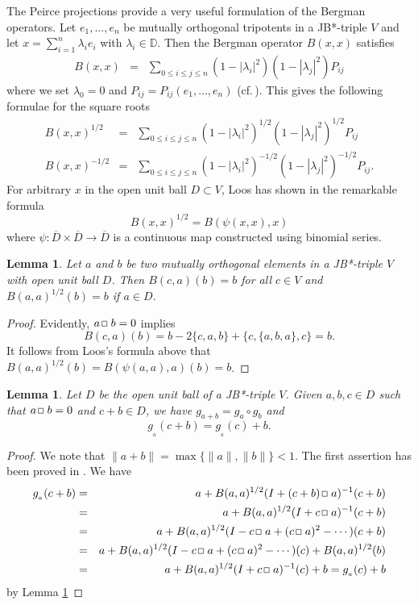 \documentclass[12pt, twoside]{article}
\def\sqr#1#2{{\,\vcenter{\vbox{\hrule height.#2pt\hbox{\vrule width.#2pt
height#1pt \kern#1pt\vrule width.#2pt}\hrule height.#2pt}}\,}}
\def\bo{\sqr44\,}
\newtheorem{lemma}[theorem]{Lemma}
\theoremstyle{definition}
\numberwithin{equation}{section}
\begin{document}
The Peirce projections provide a very useful formulation of the Bergman
operators.
Let $e_{1},\dots,e_{n}$
be  mutually orthogonal tripotents in a JB*-triple $V$ and
let $x=\sum_{i=1}^{n}\lambda_{i}e_{i}$ with
$\lambda_{i}\in\mathbb{D}$.
Then the Bergman
operator $B(x,x)$ satisfies
\begin{eqnarray}
B(x,x) & = & \sum_{0\leq i\leq j\leq n}(1-|\lambda_{i}|^{2})(1-|\lambda_{j}|^{2})P_{ij}\label{eq:Loos Bergman}
\end{eqnarray}
where we set $\lambda_{0}=0$ and $P_{ij}=P_{ij}(e_1, \ldots,e_n)$ (cf.\,\cite[Corollary 3.15]{LOOS}).
This gives the following formulae
for the square roots
\begin{eqnarray}
B(x,x)^{1/2} & = & \sum_{0\leq i\leq j\leq n}(1-|\lambda_{i}|^{2})^{1/2}(1-|\lambda_{j}|^{2})^{1/2}P_{ij}\label{eq:Bergman Sq Rt}\\
B(x,x)^{-1/2} & = & \sum_{0\leq i\leq j\leq n}(1-|\lambda_{i}|^{2})^{-1/2}(1-|\lambda_{j}|^{2})^{-1/2}P_{ij}.
\label{eq:Bergman Neg Sq Rt}
\end{eqnarray}
For arbitrary $x$ in the open unit ball $D \subset V$, Loos has shown in \cite[Corollary]{loos} the  remarkable formula
$$B(x,x)^{1/2} = B(\psi(x,x),x) $$
where $\psi: \overline D \times \overline D \longrightarrow
\overline D$ is a continuous map constructed using binomial series.

\begin{lemma}\label{baab1}
Let $a$ and $b$ be two mutually orthogonal elements in a JB*-triple $V$ with open unit ball $D$. Then
$B(c,a)(b) = b$ for all $c\in V$ and $B(a,a)^{1/2}(b)=b$ if $a\in D$.
\end{lemma}

 \begin{proof}
Evidently, $a \bo b=0$ implies
$$B(c,a)(b) = b - 2 \{c,a, b\} + \{c,\{a,b,a\},c\} = b.$$
It follows from  Loos's formula above that $ B(a,a)^{1/2}(b)= B(\psi(a,a), a) (b)=b$.
\end{proof}

\begin{lemma}\label{k=0}
Let $D$ be  the open unit ball of a JB*-triple $V$. Given  $a,b, c\in D$
such that $a \bo b=0$ and $c+b\in D$, we have
$g_{a+b} = g_a \circ g_b$ and
$$g_{_{a}}(c+b) =  g_{_{ a}}(c) + b.$$
\end{lemma}
\begin{proof}
We note that $\|a+b\| = \max \{\|a\|, \|b\|\} <1$.
The first assertion has been proved in \cite{sau}.
We have
\begin{eqnarray*}
g_{_{a}}(c+b) & = & a + B( a, a)^{1/2}(I + (c+b) \bo a)^{-1}(c+b)\\
&=& a + B( a, a)^{1/2}(I+ c\bo a)^{-1}(c+b)\\
&=& a +  B( a, a)^{1/2}(I -c\bo a + (c\bo a)^2 - \cdots )(c+b)\\
&=& a +  B( a, a)^{1/2}(I-c \bo a + (c\bo a)^2 - \cdots)(c) +  B( a, a)^{1/2}(b)\\
&=& a +  B( a, a)^{1/2}(I+ c\bo a)^{-1}(c) +  b
=  g_{_{a}}(c) +  b
\end{eqnarray*}
by Lemma \ref{baab1}
\end{proof}
\end{document}
